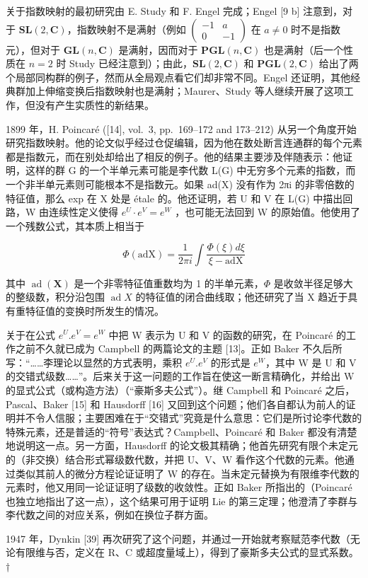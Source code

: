 
关于指数映射的最初研究由 E. Study 和 F. Engel 完成；Engel {[}9 b{]} 注意到，对于 \(\mathbf{SL}(2, \mathbf{C})\)，指数映射不是满射（例如 \(\begin{pmatrix} -1 & a \\ 0 & -1 \end{pmatrix}\) 在 \(a \neq 0\) 时不是指数元），但对于 \(\mathbf{GL}(n, \mathbf{C})\) 是满射，因而对于 \(\mathbf{PGL}(n, \mathbf{C})\) 也是满射（后一个性质在 \(n = 2\) 时 Study 已经注意到）；由此，\(\mathbf{SL}(2, \mathbf{C})\) 和 \(\mathbf{PGL}(2, \mathbf{C})\) 给出了两个局部同构群的例子，然而从全局观点看它们却非常不同。Engel 还证明，其他经典群加上伸缩变换后指数映射也是满射；Maurer、Study 等人继续开展了这项工作，但没有产生实质性的新结果。

1899 年，H. Poincaré ({[}14{]}, vol.~3, pp.~169--172 and 173--212) 从另一个角度开始研究指数映射。他的论文似乎经过仓促编辑，因为他在数处断言连通群的每个元素都是指数元，而在别处却给出了相反的例子。他的结果主要涉及伴随表示：他证明，这样的群 G 的一个半单元素可能是李代数 L(G) 中无穷多个元素的指数，而一个非半单元素则可能根本不是指数元。如果 ad(X) 没有作为 2πi 的非零倍数的特征值，那么 exp 在 X 处是 étale 的。他还证明，若 U 和 V 在 L(G) 中描出回路，W 由连续性定义使得 \(e^{U} \cdot e^{V} = e^{W}\) ，也可能无法回到 W 的原始值。他使用了一个残数公式，其本质上相当于

\[
\Phi (\mathrm{adX}) = \frac {1}{2 \pi i} \int \frac {\Phi (\xi) d \xi}{\xi - \mathrm{adX}}
\]

其中 \(\operatorname{ad}(\mathbf{X})\) 是一个非零特征值重数均为 1 的半单元素，\(\Phi\) 是收敛半径足够大的整级数，积分沿包围 \(\operatorname{ad} X\) 的特征值的闭合曲线取；他还研究了当 X 趋近于具有重特征值的变换时所发生的情况。

关于在公式 \(e^{U}.e^{V}=e^{W}\) 中把 W 表示为 U 和 V 的函数的研究，在 Poincaré 的工作之前不久就已成为 Campbell 的两篇论文的主题 {[}13{]}。正如 Baker 不久后所写：“……李理论以显然的方式表明，乘积 \(e^{U}.e^{V}\) 的形式是 \(e^{W}\)，其中 W 是 U 和 V 的交错式级数……”。后来关于这一问题的工作旨在使这一断言精确化，并给出 W 的显式公式（或构造方法）（“豪斯多夫公式”）。继 Campbell 和 Poincaré 之后，Pascal、Baker {[}15{]} 和 Hausdorff {[}16{]} 又回到这个问题；他们各自都认为前人的证明并不令人信服；主要困难在于“交错式”究竟是什么意思：它们是所讨论李代数的特殊元素，还是普适的“符号”表达式？Campbell、Poincaré 和 Baker 都没有清楚地说明这一点。另一方面，Hausdorff 的论文极其精确；他首先研究有限个未定元的（非交换）结合形式幂级数代数，并把 U、V、W 看作这个代数的元素。他通过类似其前人的微分方程论证证明了 W 的存在。当未定元替换为有限维李代数的元素时，他又用同一论证证明了级数的收敛性。正如 Baker 所指出的（Poincaré 也独立地指出了这一点），这个结果可用于证明 Lie 的第三定理；他澄清了李群与李代数之间的对应关系，例如在换位子群方面。

1947 年，Dynkin {[}39{]} 再次研究了这个问题，并通过一开始就考察赋范李代数（无论有限维与否，定义在 R、C 或超度量域上），得到了豪斯多夫公式的显式系数。†

